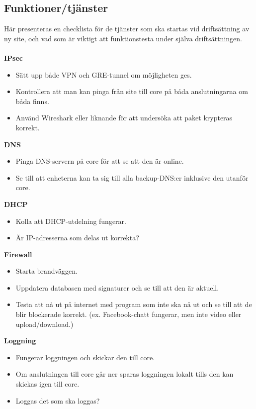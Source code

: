 \subsection{Funktioner/tjänster}
Här presenteras en checklista för de tjänster som ska startas vid driftsättning av ny site, och vad som är viktigt att funktionstesta under själva driftsättningen. \\
\\
\textbf{IPsec}
\begin{itemize}[noitemsep]
    \item Sätt upp både VPN och GRE-tunnel om möjligheten ges.
    \item Kontrollera att man kan pinga från site till core på båda anslutningarna om båda finns.
    \item Använd Wireshark eller liknande för att undersöka att paket krypteras korrekt.
\end{itemize}

\noindent \textbf{DNS}
\begin{itemize}[noitemsep]
    \item Pinga DNS-servern på core för att se att den är online.
    \item Se till att enheterna kan ta sig till alla backup-DNS:er inklusive den utanför core.
\end{itemize}

\noindent \textbf{DHCP}
\begin{itemize}[noitemsep]
\item Kolla att DHCP-utdelning fungerar.
\item Är IP-adresserna som delas ut korrekta?
\end{itemize}

\noindent \textbf{Firewall}
\begin{itemize}[noitemsep]
    \item Starta brandväggen.
    \item Uppdatera databasen med signaturer och se till att den är aktuell.
    \item Testa att nå ut på internet med program som inte ska nå ut och se till att de blir blockerade korrekt. (ex. Facebook-chatt fungerar, men inte video eller upload/download.)
\end{itemize}


\noindent \textbf{Loggning}
\begin{itemize}[noitemsep]
    \item Fungerar loggningen och skickar den till core.
    \item Om anslutningen till core går ner sparas loggningen lokalt tills den kan skickas igen till core.
    \item Loggas det som ska loggas?
\end{itemize}


